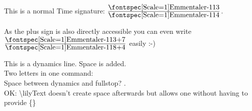 \documentclass{scrartcl}
\newcommand*{\lilyTimeSignature}[2]{$\frac{\mbox{\lilyText{#1}}}{\mbox{\lilyText{#2}}}$}
\begin{document}
	\LARGE
	
	\lilyS\lilyF\lilyM\lilyR\lilyP
	
	This is a normal Time signature: \lilyTimeSignature{3}{4}.
	
	As the plus sign is also directly accessible you can even
	write \lilyTimeSignature{3+7}{8+4} easily :-)

	This is a dynamics  line. Space is added.\\
	Two letters in one command: \\
	Space between dynamics and fullstop? .\\
	OK: \textbackslash lilyText doesn't create space afterwards but allows one without having to provide \{\}
	
\end{document}
